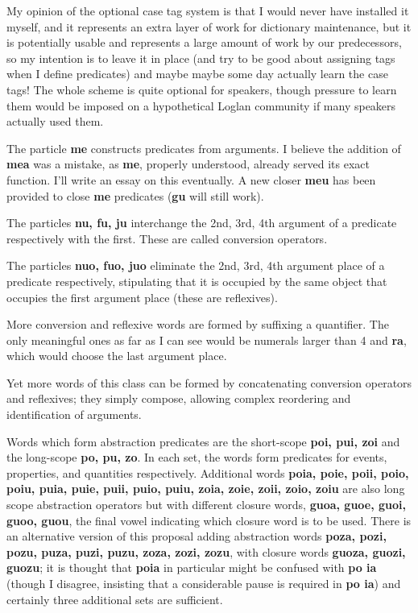 \documentclass[12pt]{book}
\begin{document}
{My opinion of the optional case tag system is that I would never have installed it myself, and it represents an extra layer of work for dictionary maintenance, but it is potentially usable and represents a large amount of work by our predecessors, so my intention is to leave it in place (and try to be good about assigning tags when I define predicates) and maybe maybe some day actually learn the case tags!   The whole scheme is quite optional for speakers, though pressure to learn them would be imposed on a hypothetical Loglan community if many speakers actually used them.

The particle {\bf me} constructs predicates from arguments.   I believe the addition of {\bf mea} was a mistake, as {\bf me}, properly understood, already served its exact function.  I'll write an essay on this eventually.  A new closer {\bf meu} has been provided to close {\bf me} predicates
({\bf gu} will still work).

The particles {\bf nu, fu, ju} interchange the 2nd, 3rd, 4th argument of a predicate respectively with the first.   These are called conversion operators.

The particles {\bf nuo, fuo, juo} eliminate the 2nd, 3rd, 4th argument place of a predicate respectively, stipulating that it is occupied by the same object that occupies the first argument place
(these are reflexives).

More conversion and reflexive words are formed by suffixing a quantifier.   The only meaningful ones as far as I can see would be numerals larger than 4 and {\bf ra}, which would choose the last argument place.

Yet more words of this class can be formed by concatenating conversion operators and reflexives; they simply compose, allowing complex reordering and identification of arguments.

Words which form abstraction predicates are the short-scope {\bf poi, pui, zoi} and the long-scope {\bf po, pu, zo}.  In each set, the words form predicates for events, properties, and quantities respectively.  Additional words {\bf poia, poie, poii, poio, poiu, puia, puie, puii, puio, puiu, zoia, zoie, zoii, zoio, zoiu} are also long scope abstraction operators but with different closure words, {\bf guoa, guoe, guoi, guoo, guou}, the final vowel indicating which closure word is to be used.  There is an alternative version of this proposal adding abstraction words {\bf poza, pozi, pozu, puza, puzi, puzu, zoza, zozi, zozu}, with closure words {\bf guoza, guozi, guozu}; it is thought that {\bf poia} in particular might be confused with {\bf po ia} (though I disagree, insisting that a considerable pause is required in {\bf po ia}) and certainly three additional sets are sufficient.


}
\end{document}
